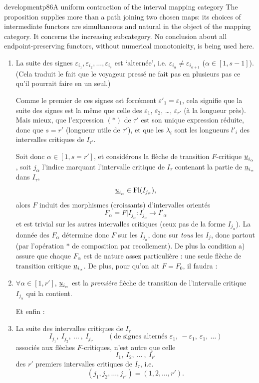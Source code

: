 \begin{dcomment}{development}{p86}{A uniform contraction of the interval mapping category}
The proposition supplies more than a path joining two chosen maps: its choices of intermediate functors are simultaneous and natural in the object of the mapping category. It concerns the increasing subcategory. No conclusion about all endpoint-preserving functors, without numerical monotonicity, is being used here.
\end{dcomment}


\begin{enumerate}[label={}, leftmargin=*]
\item[a)] La suite des signes $\varepsilon_{i_1},\varepsilon_{i_2},\dots,\varepsilon_{i_s}$ est ‘alternée’, i.e. $\varepsilon_{i_\alpha}\neq\varepsilon_{i_{\alpha+1}}$ ($\alpha\in[1,s-1]$). (Cela traduit le fait que le voyageur pressé ne fait pas en plusieurs pas ce qu'il pourrait faire en un seul.)

Comme le premier de ces signes est forcément $\varepsilon'_1=\varepsilon_1$, cela signifie que la suite des signes est la même que celle des $\varepsilon_1$, $\varepsilon_2$, \dots, $\varepsilon_{r'}$ (à la longueur près). Mais mieux, que l'expression $(*)$ de $\tau'$ est son unique expression réduite, donc que $s=r'$ (longueur utile de $\tau'$), et que les $\lambda_i$ sont les longueurs $l'_i$ des intervalles critiques de $I_{\tau'}$.


Soit donc $\alpha\in[1,s=r']$, et considérons la flèche de transition $F$-critique $\underline{u}_{i_\alpha}$, soit $j_\alpha$ l'indice marquant l'intervalle critique de $I_\tau$ contenant la partie de $\underline{u}_{i_\alpha}$ dans $I_\tau$,
\[
\underline{u}_{i_\alpha}\in\mathrm{Fl}(I_{j_\alpha}),
\]
alors $F$ induit des morphismes (croissants) d'intervalles orientés
\[
F_\alpha=F|I_{j_\alpha}:I_{j_\alpha}\longrightarrow I'_\alpha
\]
et est trivial sur les autres intervalles critiques (ceux pas de la forme $I_{j_\alpha}$). La donnée des $F_\alpha$ détermine donc $F$ sur les $I_{j_\alpha}$, donc sur \textit{tous} les $I_j$, donc partout (par l'opération $*$ de composition par recollement). De plus la condition a) assure que chaque $F_\alpha$ est de nature assez particulière : une seule flèche de transition critique $\underline{u}_{i_\alpha}$. De plus, pour qu'on ait $F=F_0$, il faudra :

\item[b)] $\forall\alpha\in[1,r']$, $\underline{u}_{i_\alpha}$ est la \textit{première} flèche de transition de l'intervalle critique $I_{j_\alpha}$ qui la contient.

Et enfin :

\item[c)] La suite des intervalles critiques de $I_\tau$
\[
I_{j_1},\ I_{j_2},\ \dots\ ,\ I_{j_{r'}}\qquad(\text{de signes alternés }\varepsilon_1,\ -\varepsilon_1,\ \varepsilon_1,\ \ldots)
\]
associés aux flèches $F$-critiques, n'est autre que celle
\[
I_1,\ I_2,\ \dots\ ,\ I_{r'}
\]
des $r'$ premiers intervalles critiques de $I_\tau$, i.e.
\[
(j_1,j_2,\dots,j_{r'})=(1,2,\dots,r').
\]
\end{enumerate}

